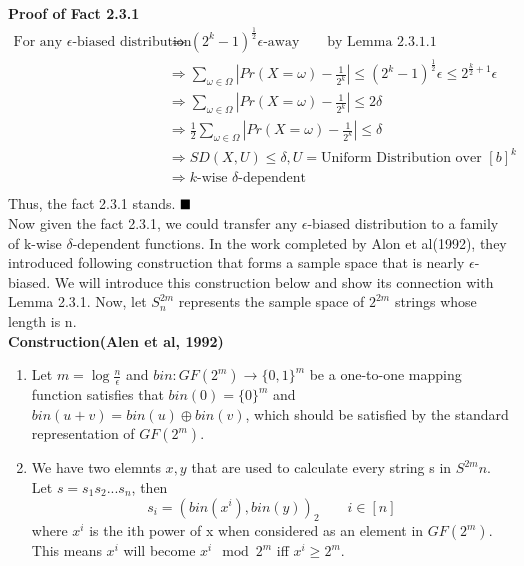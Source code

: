 \documentclass[a4paper, english]{paper}
\begin{document}
	\noindent\textbf{Proof of Fact 2.3.1}
	\begin{align*}
	\text{For any $\epsilon$-biased distribution }&\Rightarrow (2^k-1)^{\frac12}\epsilon\text{-away}\qquad\text{by Lemma 2.3.1.1}\\
	&\Rightarrow \sum_{\omega\in \Omega}| Pr(X = \omega) - \frac1{2^k}|\le (2^k-1)^{\frac12}\epsilon\le2^{\frac k2+1}\epsilon\\
	&\Rightarrow \sum_{\omega\in \Omega}| Pr(X = \omega) - \frac1{2^k}|\le 2\delta\\
	&\Rightarrow \frac12\sum_{\omega\in \Omega}| Pr(X = \omega) - \frac1{2^k}|\le \delta\\
 	&\Rightarrow SD(X,U)\le \delta, U=\text{Uniform Distribution over }[b]^k\\
	&\Rightarrow k\text{-wise }\delta\text{-dependent }\\
	\end{align*}
	Thus, the fact 2.3.1 stands. $\hfill\blacksquare$ \\

Now given the fact 2.3.1, we could transfer any $\epsilon$-biased distribution to a family of k-wise $\delta$-dependent functions. In the work completed by Alon et al(1992), they introduced following construction that forms a sample space that is nearly $\epsilon$-biased. We will introduce this construction below and show its connection with Lemma 2.3.1. Now, let $S^{2m}_n$ represents the sample space of $2^{2m}$ strings whose length is n.\\
	\noindent\textbf{Construction(Alen et al, 1992)}
	\begin{enumerate}
	\item Let $m=\log\frac n \epsilon$ and $bin: GF(2^m)\rightarrow\{0,1\}^m$ be a one-to-one mapping function satisfies that $bin(0)=\{0\}^m$ and $bin(u+v)=bin(u)\oplus bin(v)$, which should be satisfied by the standard representation of $GF(2^m)$.
	\item We have two elemnts $x,y$ that are used to calculate every string s in $S^{2m}n$. Let $s = s_1s_2...s_n$, then $$s_i = (bin(x^i),bin(y))_2\qquad i\in[n]$$ where $x^i$ is the ith power of x when considered as an element in $GF(2^m)$. This means $x^i$ will become $x^i \mod 2^m$ iff $x^i\ge 2^m$.
	\end{enumerate}
\end{document}
